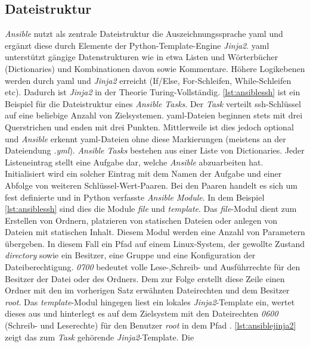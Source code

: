 \documentclass[titlepage]{report}
\begin{document}
\subsection*{Dateistruktur}
\emph{Ansible} nutzt als zentrale Dateistruktur die Auszeichnungssprache
\gls{yaml} und ergänzt diese durch Elemente der
Python\hyp{}Template\hyp{}Engine \emph{Jinja2}. \gls{yaml} unterstützt
gängige Datenstrukturen wie in etwa Listen und Wörterbücher
(Dictionaries) und Kombinationen davon sowie Kommentare. Höhere
Logikebenen werden durch \gls{yaml} und \emph{Jinja2} erreicht (If/Else,
For\hyp{}Schleifen, While\hyp{}Schleifen etc). Dadurch ist \emph{Jinja2}
in der Theorie Turing-Vollständig. \autoref{lst:ansiblessh} ist ein
Beispiel für die Dateistruktur eines \emph{Ansible Tasks}. Der
\emph{Task} verteilt \gls{ssh}\hyp{}Schlüssel auf eine beliebige Anzahl
von Zielsystemen.  \gls{yaml}\hyp{}Dateien beginnen stets mit drei
Querstrichen und enden mit drei Punkten.  Mittlerweile ist dies jedoch
optional und \emph{Ansible} erkennt \gls{yaml}\hyp{}Dateien ohne diese
Markierungen (meistens an der Dateiendung \emph{.yml}). \emph{Ansible
Tasks} bestehen aus einer Liste von Dictionaries. Jeder Listeneintrag
stellt eine Aufgabe dar, welche \emph{Ansible} abzuarbeiten hat.
Initialisiert wird ein solcher Eintrag mit dem Namen der Aufgabe und
einer Abfolge von weiteren Schlüssel\hyp{}Wert\hyp{}Paaren. Bei den
Paaren handelt es sich um fest definierte und in Python verfasste
\emph{Ansible Module}. In dem Beispiel \autoref{lst:ansiblessh} sind
dies die Module \emph{file} und \emph{template}. Das
\emph{file}\hyp{}Modul dient zum Erstellen von Ordnern, platzieren von
statischen Dateien oder anlegen von Dateien mit statischen Inhalt.
Diesem Modul werden eine Anzahl von Parametern übergeben. In diesem Fall
ein Pfad auf einem Linux\hyp{}System, der gewollte Zustand
\emph{directory} sowie ein Besitzer, eine Gruppe und eine Konfiguration
der Dateiberechtigung. \emph{0700} bedeutet volle
Lese\hyp{},Schreib\hyp{} und Ausführrechte für den Besitzer der Datei
oder des Ordners. Dem zur Folge erstellt diese Zeile einen Ordner mit
den im vorherigen Satz erwähnten Dateirechten und dem Besitzer
\emph{root}. Das \emph{template}\hyp{}Modul hingegen liest ein lokales
\emph{Jinja2}\hyp{}Template ein, wertet dieses aus und hinterlegt es auf
dem Zielsystem mit den Dateirechten \emph{0600} (Schreib\hyp{} und
Leserechte) für den Benutzer \emph{root} in dem Pfad
. \autoref{lst:ansiblejinja2}
zeigt das zum \emph{Task} gehörende \emph{Jinja2}\hyp{}Template. Die
\end{document}
